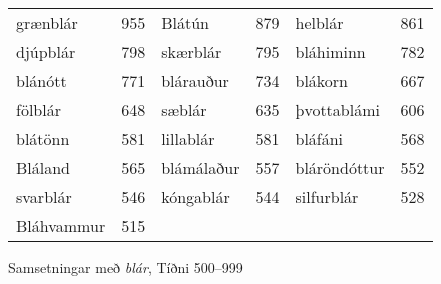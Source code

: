 \documentclass[../samsetningasafn.tex]{subfiles}
\begin{document}
\begin{wordlist}[H]
\begin{tcolorbox}

	\setlength{\extrarowheight}{3pt}
	\begin{tabular}{BlBlBl}
		grænblár	& 955		& 	
		Blátún		& 879		& 		
		helblár		& 861		\\  			
		djúpblár		& 798		& 	 
		skærblár	& 795		&  	
		bláhiminn	& 782		\\  		
		blánótt		& 771		& 		
		blárauður	& 734		& 		
		blákorn		& 667		\\ 		
		fölblár		& 648		& 		
		sæblár		& 635		& 	
		þvottablámi  & 606		\\ 		
		blátönn		& 581		& 	
		lillablár		& 581		& 		
		bláfáni		& 568		\\ 			
		Bláland		& 565		& 			
		blámálaður	& 557		& 		
		bláröndóttur	& 552		\\ 
		svarblár		& 546		& 			
		kóngablár	& 544		& 		
		silfurblár	& 528		\\ 	
		Bláhvammur	& 515		& 		
	\end{tabular}

\end{tcolorbox}
	\caption{Samsetningar með \textit{blár}, Tíðni 500--999}
	\label{listi:blatt.500}
\end{wordlist}	
\end{document}
